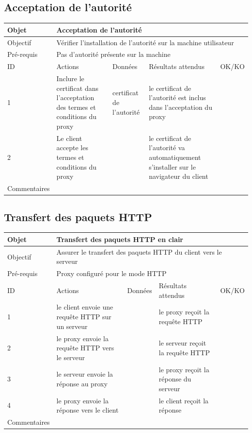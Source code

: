 \documentclass[a4paper,11pt,french]{article}
\begin{document}
\newpage

\subsection{Acceptation de l'autorité}

\begin{tabular}{|m{2.5cm}|m{4cm}|m{3cm}|m{3.5cm}|m{2cm}|}
\hline 
\rowcolor{Blue} Objet & \multicolumn{4}{|l|}{Acceptation de l'autorité} \\ 
\hline 
\rowcolor{Blue} Objectif & \multicolumn{4}{|l|}{Vérifier l'installation de l'autorité sur la machine utilisateur} \\ 
\hline 
\rowcolor{Blue} Pré-requis & \multicolumn{4}{|l|}{Pas d'autorité présente sur la machine} \\ 
\hline 
\rowcolor{Orange} ID & Actions & Données & Résultats attendus & OK/KO \\ 
\hline 
1 & Inclure le certificat dans l'acceptation des termes et conditions du proxy & certificat de l'autorité & le certificat de l'autorité est inclus dans l'acceptation du proxy &  \\ 
\hline
2 & Le client accepte les termes et conditions du proxy & & le certificat de 
l'autorité va automatiquement s'installer sur le navigateur du client & 
\\
\hline 
Commentaires & \multicolumn{4}{|l|}{} \\ 
\hline
\end{tabular}

\newpage

\subsection{Transfert des paquets HTTP}

\begin{tabular}{|m{2.5cm}|m{4cm}|m{3cm}|m{3.5cm}|m{2cm}|}
\hline 
\rowcolor{Blue} Objet & \multicolumn{4}{|l|}{Transfert des paquets HTTP en clair} \\ 
\hline 
\rowcolor{Blue} Objectif & \multicolumn{4}{|l|}{Assurer le transfert des paquets HTTP du client vers le serveur} \\ 
\hline 
\rowcolor{Blue} Pré-requis & \multicolumn{4}{|l|}{Proxy configuré pour le mode HTTP} \\ 
\hline 
\rowcolor{Orange} ID & Actions & Données & Résultats attendus & OK/KO \\ 
\hline 
1 & le client envoie une requête HTTP sur un serveur &  & le proxy reçoit la requête HTTP &  \\ 
\hline
2 & le proxy envoie la requête HTTP vers le serveur & & le serveur reçoit la requête HTTP & \\
\hline
3 & le serveur envoie la réponse au proxy & & le proxy 
reçoit la réponse du serveur & \\
\hline 
4 & le proxy envoie la réponse vers le client & & le client reçoit la réponse & 
\\
\hline
Commentaires & \multicolumn{4}{|l|}{} \\ 
\hline
\end{tabular}
\end{document}
